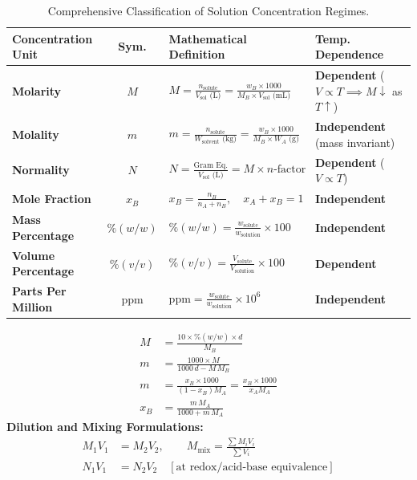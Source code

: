 \documentclass[10pt,twoside,openright]{book}
\begin{document}
\begin{table}[htbp]
\centering
\footnotesize
\setlength{\tabcolsep}{3pt}
\renewcommand{\arraystretch}{1.2}
\begin{tabularx}{\textwidth}{>{\bfseries}l c X >{\raggedright\arraybackslash}p{2.6cm}}
\toprule
\textbf{Concentration Unit} & \textbf{Sym.} & \textbf{Mathematical Definition} & \textbf{Temp. Dependence} \\
\midrule
Molarity & $M$ & $M = \frac{n_{\text{solute}}}{V_{\text{sol}}\text{ (L)}} = \frac{w_B \times 1000}{M_B \times V_{\text{sol}}\text{ (mL)}}$ & \textbf{Dependent} ($V \propto T \implies M \downarrow$ as $T \uparrow$) \\
Molality & $m$ & $m = \frac{n_{\text{solute}}}{W_{\text{solvent}}\text{ (kg)}} = \frac{w_B \times 1000}{M_B \times W_A\text{ (g)}}$ & \textbf{Independent} (mass invariant) \\
Normality & $N$ & $N = \frac{\text{Gram Eq.}}{V_{\text{sol}}\text{ (L)}} = M \times n\text{-factor}$ & \textbf{Dependent} ($V \propto T$) \\
Mole Fraction & $x_B$ & $x_B = \frac{n_B}{n_A + n_B}, \quad x_A + x_B = 1$ & \textbf{Independent} \\
Mass Percentage & $\%(w/w)$ & $\%(w/w) = \frac{w_{\text{solute}}}{w_{\text{solution}}} \times 100$ & \textbf{Independent} \\
Volume Percentage & $\%(v/v)$ & $\%(v/v) = \frac{V_{\text{solute}}}{V_{\text{solution}}} \times 100$ & \textbf{Dependent} \\
Parts Per Million & $\text{ppm}$ & $\text{ppm} = \frac{w_{\text{solute}}}{w_{\text{solution}}} \times 10^6$ & \textbf{Independent} \\
\bottomrule
\end{tabularx}
\caption{Comprehensive Classification of Solution Concentration Regimes.}
\end{table}

\begin{formulabox}[Master Interconversion Formulations ($d = \text{density in }\si{g.mL^{-1}}$)]
\begin{align}
  M &= \frac{10 \times \%(w/w) \times d}{M_B} \\
  m &= \frac{1000 \times M}{1000\,d - M\,M_B} \\
  m &= \frac{x_B \times 1000}{(1 - x_B)M_A} = \frac{x_B \times 1000}{x_A M_A} \\
  x_B &= \frac{m\,M_A}{1000 + m\,M_A}
\end{align}
\textbf{Dilution and Mixing Formulations:}
\begin{align}
  M_1 V_1 &= M_2 V_2, \qquad M_{\text{mix}} = \frac{\sum M_i V_i}{\sum V_i} \\
  N_1 V_1 &= N_2 V_2 \quad [\text{at redox/acid-base equivalence}]
\end{align}
\end{formulabox}
\end{document}
